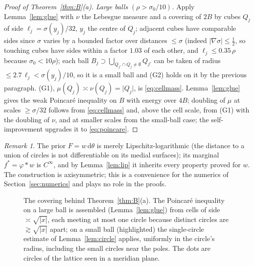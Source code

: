 \documentclass[11pt]{amsart}
\newcommand{\dd}{\,\mathrm{d}}
\newcommand{\abs}[1]{\lvert #1\rvert}
\theoremstyle{plain}
\theoremstyle{definition}
\theoremstyle{remark}
\newtheorem{remark}[theorem]{Remark}
\begin{document}
\begin{proof}[Proof of Theorem~\ref{thm:B}(a)]
\emph{Large balls $(\rho>\sigma_0/10)$.} Apply Lemma~\ref{lem:glue} with $\nu$ the
Lebesgue measure and a covering of $2B$ by cubes $Q_j$ of side
$\ell_j=\sigma(y_j)/32$, $y_j$ the centre of $Q_j$; adjacent cubes have
comparable sides since $\sigma$ varies by a bounded factor over distances
$\le\sigma$ (indeed $\abs{\nabla\sigma}\le\tfrac12$, so touching cubes have
sides within a factor $1.03$ of each other, and $\ell_j\le0.35\,\rho$ because
$\sigma_0<10\rho$); each ball $B_j\supset\bigcup_{Q_{j'}\cap Q_j\ne\emptyset}Q_{j'}$
can be taken of radius $\le2.7\,\ell_j<\sigma(y_j)/10$, so it is a small ball
and (G2) holds on it by the previous paragraph. (G1),
$\mu(Q_j)\asymp\nu(Q_j)=\abs{Q_j}$, is
\eqref{eq:cellmass}. Lemma~\ref{lem:glue} gives the weak Poincar\'e inequality on
$B$ with energy over $4B$; doubling of $\mu$ at scales $\ge\sigma/32$ follows
from \eqref{eq:cellmass} and, above the cell scale, from (G1) with the doubling
of $\nu$, and at smaller scales from the small-ball case; the
self-improvement \cite[Thms.~5.1, 9.7]{hajlaszkoskela2000} upgrades it to
\eqref{eq:poincare}.
\end{proof}

\begin{remark}
The prior $F=w\dd\theta$ is merely Lipschitz-logarithmic (the distance to a
union of circles is not differentiable on its medial surfaces); its marginal
$f^*=\varphi*w$ is $C^\infty$, and by Lemma~\ref{lem:lip} it inherits every
property proved for $w$. The construction is axisymmetric; this is a
convenience for the numerics of Section~\ref{sec:numerics} and plays no role in
the proofs.
\end{remark}

\begin{figure}[t]
\centering
{}
\caption{The covering behind Theorem~\ref{thm:B}(a). The Poincar\'e inequality on
a large ball is assembled (Lemma~\ref{lem:glue}) from cells of side
$\asymp\sqrt{\abs x}$, each meeting at most one circle because distinct circles
are $\gtrsim\sqrt{\abs x}$ apart; on a small ball (highlighted) the single-circle
estimate of Lemma~\ref{lem:circle} applies, uniformly in the circle's radius,
including the small circles near the poles. The dots are circles of the lattice
seen in a meridian plane.}
\label{fig:covering}
\end{figure}
\end{document}
